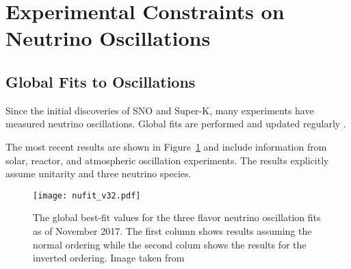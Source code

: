 \section{Experimental Constraints on Neutrino Oscillations}

\label{sec:solar_neutrinos}


\label{sec:superk_atmo}


\label{subsec:global_fits}
\subsection{Global Fits to Oscillations}
Since the initial discoveries of SNO and Super-K, many experiments have measured neutrino oscillations. 
Global fits are performed and updated regularly \cite{NuFit_2.2, NuFit.org}.

The most recent results are shown in Figure~\ref{fig:nufit_v32} and include information from solar, reactor, and atmospheric oscillation experiments.
The results explicitly assume unitarity and three neutrino species.

\begin{figure}[!h]
\texttt{[image: nufit\_v32.pdf]}
\caption{The global best-fit values for the three flavor neutrino oscillation fits as of November 2017. The first column shows results assuming the normal ordering while the second colum shows the results for the inverted ordering. Image taken from \cite{NuFit.org}}
\label{fig:nufit_v32}
\end{figure}

